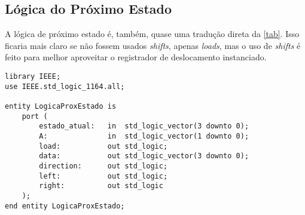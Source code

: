 \documentclass[a4paper,12pt]{article}
\newenvironment{code}{\captionsetup{type=listing}}{}
\begin{document}
\subsection{Lógica do Próximo Estado}
A lógica de próximo estado é, também, quase uma tradução direta da \autoref{tab}. Isso ficaria mais claro se não fossem usados \textit{shifts}, apenas \textit{loads}, mas o uso de \textit{shifts} é feito para melhor aproveitar o registrador de deslocamento instanciado.

\begin{code}
    \begin{verbatim}
library IEEE;
use IEEE.std_logic_1164.all;

entity LogicaProxEstado is
    port (
        estado_atual:   in  std_logic_vector(3 downto 0);
        A:              in  std_logic_vector(1 downto 0);
        load:           out std_logic;
        data:           out std_logic_vector(3 downto 0);
        direction:      out std_logic;
        left:           out std_logic;
        right:          out std_logic
    );
end entity LogicaProxEstado;


\end{verbatim}
\end{code}
\end{document}
